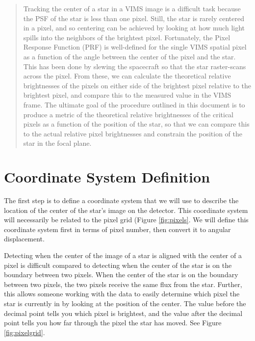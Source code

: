 \documentclass[12pt]{article}
\begin{document}
\maketitle

\begin{abstract}
Tracking the center of a star in a VIMS image is a difficult task because the
PSF of the star is less than one pixel. Still, the star is rarely centered in a
pixel, and so centering can be achieved by looking at how much light spills
into the neighbors of the brightest pixel. Fortunately, the Pixel Response
Function (PRF) is well-defined for the single VIMS spatial pixel as a function
of the angle between the center of the pixel and the star. This has been done
by slewing the spacecraft so that the star raster-scans across the pixel. From
these, we can calculate the theoretical relative brightnesses of the pixels on
either side of the brightest pixel relative to the brightest pixel, and compare
this to the measured value in the VIMS frame. The ultimate goal of the
procedure outlined in this document is to produce a metric of the theoretical
relative brightnesses of the critical pixels as a function of the position of
the star, so that we can compare this to the actual relative pixel brightnesses
and constrain the position of the star in the focal plane.
\end{abstract}

\section{Coordinate System Definition}

The first step is to define a coordinate system that we will use to describe
the location of the center of the star's image on the detector. This coordinate
system will necessarily be related to the pixel grid (Figure \ref{fig:pixels}.
We will define this coordinate system first in terms of pixel number, then
convert it to angular displacement.

Detecting when the center of the image of a star is aligned with the center of
a pixel is difficult compared to detecting when the center of the star is on the
boundary between two pixels. When the center of the star is on the boundary
between two pixels, the two pixels receive the same flux from the star. Further,
this allows someone working with the data to easily determine which pixel the
star is currently in by looking at the position of the center. The value before
the decimal point tells you which pixel is brightest, and the value after the
decimal point tells you how far through the pixel the star has moved. See Figure
\ref{fig:pixelgrid}.
\end{document}
